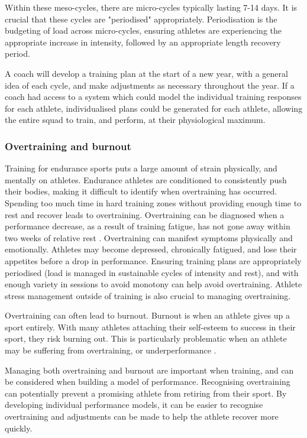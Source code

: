 Within these meso-cycles, there are micro-cycles typically lasting 7-14 days. It is crucial that these cycles are "periodised" appropriately. Periodisation is the budgeting of load across micro-cycles, ensuring athletes are experiencing the appropriate increase in intensity, followed by an appropriate length recovery period.

A coach will develop a training plan at the start of a new year, with a general idea of each cycle, and make adjustments as necessary throughout the year. If a coach had access to a system which could model the individual training responses for each athlete, individualised plans could be generated for each athlete, allowing the entire squad to train, and perform, at their physiological maximum. 

\subsubsection{Overtraining and burnout}
Training for endurance sports puts a large amount of strain physically, and mentally on athletes. Endurance athletes are conditioned to consistently push their bodies, making it difficult to identify when overtraining has occurred. Spending too much time in hard training zones without providing enough time to rest and recover leads to overtraining. Overtraining can be diagnosed when a performance decrease, as a result of training fatigue, has not gone away within two weeks of relative rest \cite{kayser2004chronic}. Overtraining can manifest symptoms physically and emotionally. Athletes may become depressed, chronically fatigued, and lose their appetites before a drop in performance. Ensuring training plans are appropriately periodised (load is managed in sustainable cycles of intensity and rest), and with enough variety in sessions to avoid monotony can help avoid overtraining. Athlete stress management outside of training is also crucial to managing overtraining.

Overtraining can often lead to burnout. Burnout is when an athlete gives up a sport entirely. With many athletes attaching their self-esteem to success in their sport, they risk burning out. This is particularly problematic when an athlete may be suffering from overtraining, or underperformance \cite{gustafsson2007burnout}.

Managing both overtraining and burnout are important when training, and can be considered when building a model of performance. Recognising overtraining can potentially prevent a promising athlete from retiring from their sport. By developing individual performance models, it can be easier to recognise overtraining and adjustments can be made to help the athlete recover more quickly.

